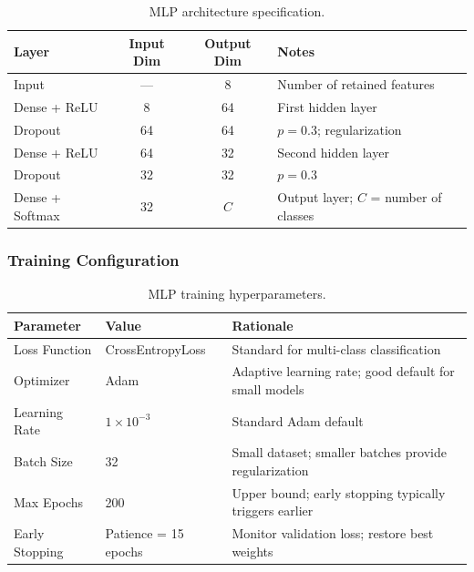 \documentclass[11pt,letterpaper]{article}
\begin{document}
	\begin{table}[ht!]
		\centering
		\caption{MLP architecture specification.}
		\label{tab:mlp_arch}
		\renewcommand{\arraystretch}{1.3}
		\begin{tabularx}{\textwidth}{l c c X}
			\toprule
			\textbf{Layer} & \textbf{Input Dim} & \textbf{Output Dim} & \textbf{Notes} \\
			\midrule
			Input & --- & 8 & Number of retained features \\
			Dense + ReLU & 8 & 64 & First hidden layer \\
			Dropout & 64 & 64 & $p = 0.3$; regularization \\
			Dense + ReLU & 64 & 32 & Second hidden layer \\
			Dropout & 32 & 32 & $p = 0.3$ \\
			Dense + Softmax & 32 & $C$ & Output layer; $C$ = number of classes \\
			\bottomrule
		\end{tabularx}
	\end{table}

	\subsubsection{Training Configuration}

	\begin{table}[ht!]
		\centering
		\caption{MLP training hyperparameters.}
		\label{tab:mlp_train}
		\renewcommand{\arraystretch}{1.3}
		\begin{tabular}{l l l}
			\toprule
			\textbf{Parameter} & \textbf{Value} & \textbf{Rationale} \\
			\midrule
			Loss Function & CrossEntropyLoss & Standard for multi-class classification \\
			Optimizer & Adam & Adaptive learning rate; good default for small models \\
			Learning Rate & $1 \times 10^{-3}$ & Standard Adam default \\
			Batch Size & 32 & Small dataset; smaller batches provide regularization \\
			Max Epochs & 200 & Upper bound; early stopping typically triggers earlier \\
			Early Stopping & Patience = 15 epochs & Monitor validation loss; restore best weights \\
			\bottomrule
		\end{tabular}
	\end{table}
\end{document}

